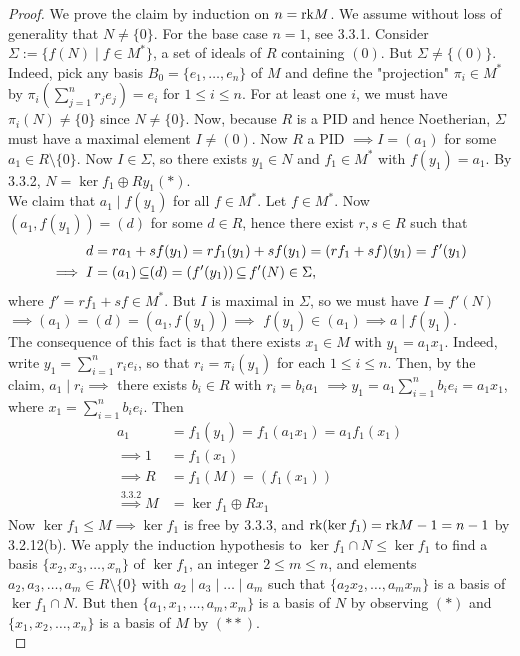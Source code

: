 \documentclass[11pt]{book}
\theoremstyle{definition}   \newtheorem{defn}[counter]{Definition} %
\newcommand{\bs}{\setminus}   \newcommand{\A}{\mathcal{A}}   \newcommand{\sy}{\textnormal{Syl}}   \newcommand{\size}[1]{\left| #1 \right|}
\numberwithin{counter}{chapter}
\begin{document}
\begin{proof}
We prove the claim by induction on $n = \textnormal{rk} M$. We assume without loss of generality that $N \ne \{0\}$. For the base case $n = 1$, see 3.3.1. Consider $\Sigma := \{f(N) \mid f \in M^*\}$, a set of ideals of $R$ containing $(0)$. But $\Sigma \ne \{(0)\}$. Indeed, pick any basis $B_0 = \{e_1,\dots,e_n\}$ of $M$ and define the "projection" $\pi_i \in M^*$ by $\pi_i(\sum_{j=1}^n r_j e_j) = e_i$ for $1 \leq i \leq n$. For at least one $i$, we must have $\pi_i(N) \ne \{0\}$ since $N \ne \{0\}$. Now, because $R$ is a PID and hence Noetherian, $\Sigma$ must have a maximal element $I \ne (0)$. Now $R$ a PID $\implies I = (a_1)$ for some $a_1 \in R \bs \{0\}$. Now $I \in \Sigma$, so there exists $y_1 \in N$ and $f_1 \in M^*$ with $f(y_1) = a_1$. By 3.3.2, $N = \ker f_1 \oplus Ry_1 (\ast)$. \\

We claim that $a_1 \mid f(y_1)$ for all $f \in M^*$. Let $f \in M^*$. Now $(a_1,f(y_1)) = (d)$ for some $d \in R$, hence there exist $r,s \in R$ such that 
	\begin{align*} 
	d &= ra_1 + s f(y_1) = r f_1(y_1) + s f(y_1) = (rf_1 + sf)(y_1) = f'(y_1) \\
	\implies I &= (a_1) \operatorname{\subseteq} (d) = (f'(y_1)) \operatorname{\subseteq} f'(N) \in \Sigma,
	\end{align*}
where $f' = rf_1 + sf \in M^*$. But $I$ is maximal in $\Sigma$, so we must have $I = f'(N)$ $\implies (a_1) = (d) = (a_1,f(y_1)) \implies $ $f(y_1) \in (a_1) \implies a \mid f(y_1)$. \\

The consequence of this fact is that there exists $x_1 \in M$ with $y_1 = a_1 x_1$. Indeed, write $y_1 = \sum_{i=1}^n r_i e_i$, so that $r_i = \pi_i(y_1)$ for each $1 \leq i \leq n$. Then, by the claim, $a_1 \mid r_i \implies$ there exists $b_i \in R$ with $r_i = b_i a_1 $ $\implies y_1 = a_1 \sum_{i=1}^n b_i e_i = a_1 x_1$, where $x_1 = \sum_{i=1}^n b_i e_i$. Then
	\begin{align*} 
	a_1 &= f_1(y_1) = f_1(a_1x_1) = a_1 f_1(x_1) \\
	\implies 1 &= f_1(x_1) \\
	\implies R &= f_1(M) = (f_1(x_1)) \\
	\overset{3.3.2}{\implies} M &= \ker f_1 \oplus R x_1 \tag{$\ast \ast$}
	\end{align*}
Now $\ker f_1 \leq M \implies \ker f_1$ is free by 3.3.3, and $\textnormal{rk}(\ker f_1) = \textnormal{rk} M - 1 = n-1$ by 3.2.12(b). We apply the induction hypothesis to $\ker f_1 \cap N \leq \ker f_1$ to find a basis $\{x_2,x_3,\dots,x_n\}$ of $\ker f_1$, an integer $2 \leq m \leq n$, and elements $a_2,a_3,\dots,a_m \in R \bs \{0\}$ with $a_2 \mid a_3 \mid \dots \mid a_m$ such that $\{a_2x_2,\dots,a_mx_m\}$ is a basis of $\ker f_1 \cap N$. But then $\{a_1,x_1,\dots,a_m,x_m\}$ is a basis of $N$ by observing $(\ast)$ and $\{x_1,x_2,\dots,x_n\}$ is a basis of $M$ by $(\ast \ast)$. \\


\end{proof}
\end{document}
